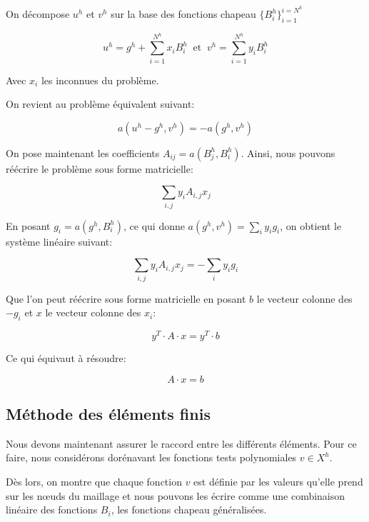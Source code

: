 \documentclass{article}
\begin{document}
On décompose $u^h$ et $v^h$ sur la base des fonctions chapeau
$\{B^h_i\}^{i=N^h}_{i=1}$

\begin{equation}
    u^h = g^h + \sum_{i=1}^{N^h} x_i B^h_i
    \ \text{ et } \ v^h = \sum_{i=1}^{N^h} y_i B^h_i
\end{equation}

Avec $x_i$ les inconnues du problème.

On revient au problème équivalent suivant:

\begin{equation}
    a(u^h - g^h, v^h) = - a(g^h, v^h)
\end{equation}

On pose maintenant les coefficients $A_{ij} = a(B^h_j, B^h_i)$. Ainsi, nous pouvons
réécrire le problème sous forme matricielle:

\begin{equation}
    \sum_{i,j} y_i A_{i,j} x_j
\end{equation}

En posant $g_i = a(g^h, B^h_i)$, ce qui donne $a(g^h, v^h) = \sum_i y_i g_i$,
on obtient le système linéaire suivant:

\begin{equation}
    \sum_{i,j} y_i A_{i,j} x_j = - \sum_i y_i g_i
\end{equation}

Que l'on peut réécrire sous forme matricielle en posant $b$ le vecteur colonne
des $-g_i$ et $x$ le vecteur colonne des $x_i$:

\begin{equation}
    y^T \cdot A \cdot x =  y^T \cdot b
\end{equation}

Ce qui équivaut à résoudre:

\begin{equation}
    A \cdot x = b
\end{equation}

\subsection{Méthode des éléments finis}

Nous devons maintenant assurer le raccord entre les différents éléments.
Pour ce faire, nous considérons dorénavant les fonctions tests
polynomiales $v \in X^h$.

Dès lors, on montre que chaque fonction $v$
est définie par les valeurs qu'elle prend
sur les nœuds du maillage et nous pouvons les écrire comme une combinaison
linéaire des fonctions $B_i$, les fonctions chapeau généralisées.
\end{document}
